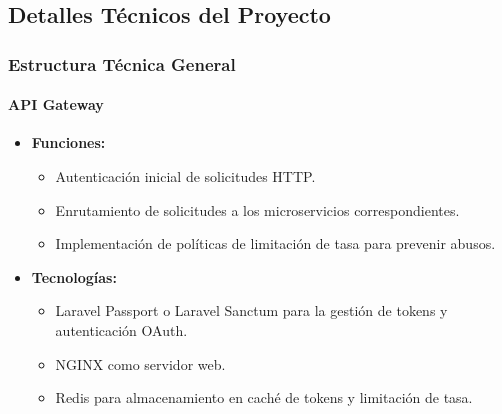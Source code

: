\documentclass{article}
\begin{document}
\subsection{Detalles Técnicos del Proyecto}

\subsubsection{Estructura Técnica General}

\paragraph{API Gateway}
\begin{itemize}
    \item \textbf{Funciones:}
          \begin{itemize}
              \item Autenticación inicial de solicitudes HTTP.
              \item Enrutamiento de solicitudes a los microservicios correspondientes.
              \item Implementación de políticas de limitación de tasa para prevenir abusos.
          \end{itemize}
    \item \textbf{Tecnologías:}
          \begin{itemize}
              \item Laravel Passport o Laravel Sanctum para la gestión de tokens y autenticación OAuth.
              \item NGINX como servidor web.
              \item Redis para almacenamiento en caché de tokens y limitación de tasa.
          \end{itemize}
\end{itemize}
\end{document}
